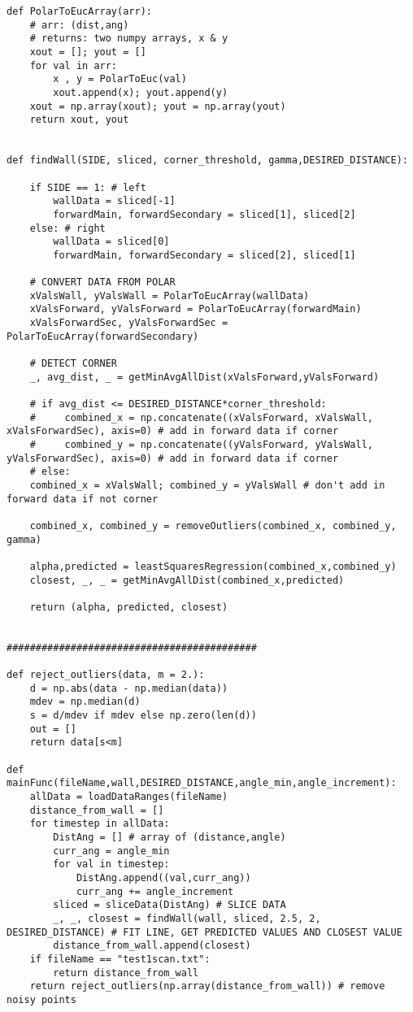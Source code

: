 \documentclass{article}
\begin{document}
{\begin{verbatim}
def PolarToEucArray(arr):
    # arr: (dist,ang)
    # returns: two numpy arrays, x & y
    xout = []; yout = []
    for val in arr:
        x , y = PolarToEuc(val)
        xout.append(x); yout.append(y)
    xout = np.array(xout); yout = np.array(yout)
    return xout, yout


def findWall(SIDE, sliced, corner_threshold, gamma,DESIRED_DISTANCE):

    if SIDE == 1: # left
        wallData = sliced[-1]
        forwardMain, forwardSecondary = sliced[1], sliced[2]
    else: # right
        wallData = sliced[0]
        forwardMain, forwardSecondary = sliced[2], sliced[1]
    
    # CONVERT DATA FROM POLAR
    xValsWall, yValsWall = PolarToEucArray(wallData)
    xValsForward, yValsForward = PolarToEucArray(forwardMain)
    xValsForwardSec, yValsForwardSec = PolarToEucArray(forwardSecondary)

    # DETECT CORNER
    _, avg_dist, _ = getMinAvgAllDist(xValsForward,yValsForward)

    # if avg_dist <= DESIRED_DISTANCE*corner_threshold:
    #     combined_x = np.concatenate((xValsForward, xValsWall, xValsForwardSec), axis=0) # add in forward data if corner
    #     combined_y = np.concatenate((yValsForward, yValsWall, yValsForwardSec), axis=0) # add in forward data if corner
    # else:
    combined_x = xValsWall; combined_y = yValsWall # don't add in forward data if not corner

    combined_x, combined_y = removeOutliers(combined_x, combined_y, gamma)

    alpha,predicted = leastSquaresRegression(combined_x,combined_y) 
    closest, _, _ = getMinAvgAllDist(combined_x,predicted)

    return (alpha, predicted, closest)


###########################################

def reject_outliers(data, m = 2.):
    d = np.abs(data - np.median(data))
    mdev = np.median(d)
    s = d/mdev if mdev else np.zero(len(d))
    out = []
    return data[s<m]

def mainFunc(fileName,wall,DESIRED_DISTANCE,angle_min,angle_increment):
    allData = loadDataRanges(fileName)
    distance_from_wall = []
    for timestep in allData:
        DistAng = [] # array of (distance,angle)
        curr_ang = angle_min
        for val in timestep:
            DistAng.append((val,curr_ang))
            curr_ang += angle_increment
        sliced = sliceData(DistAng) # SLICE DATA
        _, _, closest = findWall(wall, sliced, 2.5, 2, DESIRED_DISTANCE) # FIT LINE, GET PREDICTED VALUES AND CLOSEST VALUE
        distance_from_wall.append(closest)
    if fileName == "test1scan.txt":
        return distance_from_wall
    return reject_outliers(np.array(distance_from_wall)) # remove noisy points


\end{verbatim}}
\end{document}
